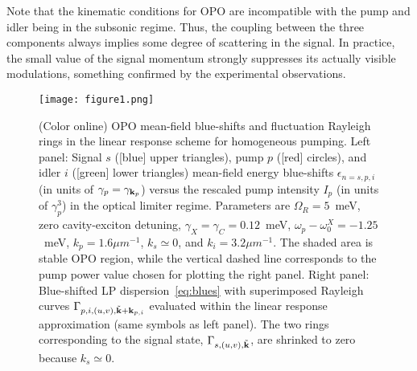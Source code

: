 Note that the kinematic conditions for OPO are incompatible with the
pump and idler being in the subsonic regime. Thus, the coupling
between the three components always implies some degree of scattering
in the signal. In practice, the small value of the signal momentum
strongly suppresses its actually visible modulations, something
confirmed by the experimental observations.


%
\begin{figure}[h!]
\centering
\texttt{[image: figure1.png]}
\caption{(Color online) OPO mean-field blue-shifts and fluctuation
  Rayleigh rings in the linear response scheme for homogeneous
  pumping. Left panel: Signal $s$ ([blue] upper triangles), pump $p$
  ([red] circles), and idler $i$ ([green] lower triangles) mean-field
  energy blue-shifts $\epsilon_{n=s,p,i}$ (in units of $\gamma_p =
  \gamma_{{\mathbf k}_p}$) versus the rescaled pump intensity $I_p$ (in
  units of $\gamma_p^3$) in the optical limiter regime. Parameters are
  $\Omega_R=5$~meV, zero cavity-exciton detuning, $\gamma_X = \gamma_C
  = 0.12$~meV, $\omega_p - \omega_0^X = -1.25$~meV, $k_p=1.6{\mu
    m}^{-1}$, $k_s \simeq 0$, and $k_i=3.2{\mu m}^{-1}$.  The shaded
  area is stable OPO region, while the vertical dashed line
  corresponds to the pump power value chosen for plotting the right
  panel. Right panel: Blue-shifted LP dispersion~\eqref{eq:blues} with
  superimposed Rayleigh curves $\Gamma_{p,i,(u,v), \tilde{{\mathbf k}} +
    {\mathbf k}_{p, i}}$ evaluated within the linear response
  approximation (same symbols as left panel). The two rings
  corresponding to the signal state, $\Gamma_{s,(u,v),
    \tilde{{\mathbf k}}}$, are shrinked to zero because $k_s \simeq 0$.}
\label{fig:spect}
\end{figure}
%

